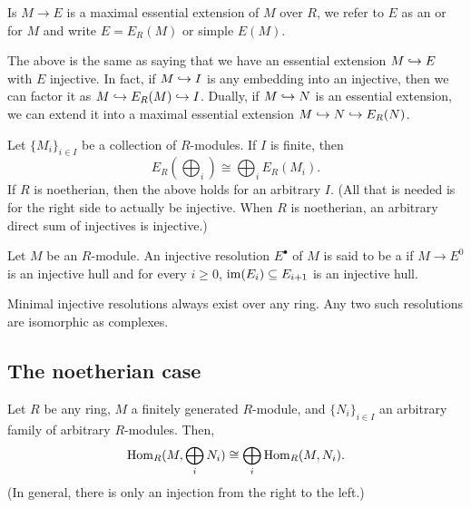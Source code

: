 \documentclass[12pt]{article}
\begin{document}
\begin{defn}
	Is $M \to E$ is a maximal essential extension of $M$ over $R$, we refer to $E$ as an  or  for $M$ and write $E = E_{R}(M)$ or simple $E(M)$.
\end{defn}
The above is the same as saying that we have an essential extension $M \hookrightarrow E$ with $E$ injective. In fact, if $M \hookrightarrow I$ is any embedding into an injective, then we can factor it as $M \hookrightarrow E_{R}(M) \hookrightarrow I$. \newline
Dually, if $M \hookrightarrow N$ is an essential extension, we can extend it into a maximal essential extension $M \hookrightarrow N \hookrightarrow E_{R}(N)$.

\begin{prop}
	Let $\{M_{i}\}_{i \in I}$ be a collection of $R$-modules. If $I$ is finite, then
	\begin{equation*} 
		E_{R}\left(\bigoplus_{i}\right) \cong \bigoplus_{i} E_{R}(M_{i}).
	\end{equation*}
	If $R$ is noetherian, then the above holds for an arbitrary $I$. (All that is needed is for the right side to actually be injective. When $R$ is noetherian, an arbitrary direct sum of injectives is injective.)
\end{prop}

\begin{defn}
	Let $M$ be an $R$-module. An injective resolution $E^{\bullet}$ of $M$ is said to be a  if $M \to E^{0}$ is an injective hull and for every $i \ge 0$, $\operatorname{im}(E_{i}) \subseteq E_{i + 1}$ is an injective hull.
\end{defn}
Minimal injective resolutions always exist over any ring. Any two such resolutions are isomorphic as complexes.

\subsection{The noetherian case}

\begin{prop}
	Let $R$ be any ring, $M$ a finitely generated $R$-module, and $\{N_{i}\}_{i \in I}$ an arbitrary family of arbitrary $R$-modules. Then,
	\begin{equation*} 
		\operatorname{Hom}_{R}(M, \bigoplus_{i} N_{i}) \cong \bigoplus_{i} \operatorname{Hom}_{R}(M, N_{i}).
	\end{equation*}
	(In general, there is only an injection from the right to the left.)
\end{prop}
\end{document}
